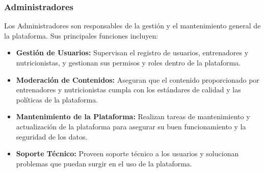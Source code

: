 \subsubsection{Administradores}

Los Administradores son responsables de la gestión y el mantenimiento general de la plataforma. Sus principales funciones incluyen:

\begin{itemize}
    \item \textbf{Gestión de Usuarios:} Supervisan el registro de usuarios, entrenadores y nutricionistas, y gestionan sus permisos y roles dentro de la plataforma.
    \item \textbf{Moderación de Contenidos:} Aseguran que el contenido proporcionado por entrenadores y nutricionistas cumpla con los estándares de calidad y las políticas de la plataforma.
    \item \textbf{Mantenimiento de la Plataforma:} Realizan tareas de mantenimiento y actualización de la plataforma para asegurar su buen funcionamiento y la seguridad de los datos.
    \item \textbf{Soporte Técnico:} Proveen soporte técnico a los usuarios y solucionan problemas que puedan surgir en el uso de la plataforma.
\end{itemize}